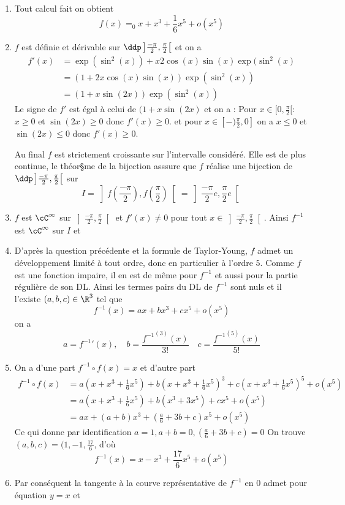\begin{correction}
\begin{enumerate}
\item Tout calcul fait on obtient 
$$f(x) =_0 x +x^3+\frac{1}{6}x^5 +o(x^5)$$
\item $f$ est définie et dérivable sur $\ddp \left] \frac{-\pi}{2},\frac{\pi}{2}\right[$ et on a 
\begin{align*}
f'(x) &= \exp(\sin^2(x)) +x 2\cos(x)\sin(x) \exp(\sin^2(x)\\
&= (1+ 2x\cos(x)\sin(x))\exp(\sin^2(x)) \\
&=(1+x\sin(2x))\exp(\sin^2(x)) 
\end{align*}
Le signe de $f'$ est égal à celui de $(1+x\sin(2x)$ et on a :
Pour $x \in [0,\frac{\pi}{2}[ :$ $x\geq 0 $ et $\sin(2x) \geq 0$ donc 
$f'(x) \geq 0$. 
et pour $x\in [-)\frac{\pi}{2} , 0]$ on a $x\leq 0$ et $\sin(2x) \leq 0$ donc $f'(x)\geq 0$.  

Au final $f$ est strictement croissante sur l'intervalle considéré. Elle est de plus  continue, le théor§me de la bijection asssure que $f$ réalise une bijection de $\ddp \left] \frac{-\pi}{2},\frac{\pi}{2}\right[$ sur $$I =\left] f(\frac{-\pi}{2}),f(\frac{\pi}{2})\right[ = \left] \frac{-\pi}{2}e,\frac{\pi}{2}e\right[$$

\item $f$ est $\cC^{\infty} $ sur  $\left] \frac{-\pi}{2},\frac{\pi}{2}\right[$ et $f'(x) \neq 0$ pour tout $x\in \left] \frac{-\pi}{2},\frac{\pi}{2}\right[$. Ainsi $f^{-1}$ est $\cC^{\infty}$ sur $I$ et 
\item D'après la question précédente et la formule de Taylor-Young, $f$ admet un développement limité à tout ordre, donc en particulier à l'ordre $5$. 
Comme $f$ est une fonction impaire, il en est de même pour $f^{-1}$ et aussi pour la partie régulière de son DL.  Ainsi les termes pairs du DL de $f^{-1}$ sont nuls et il l'existe $(a,b,c)\in \R^3$ tel que 
$$f^{-1} (x) = ax+bx^3+cx^5+o(x^5)$$
on a 
$$a={f^{-1}}'(x), \quad b = \frac{{f^{-1}}^{(3)}(x)}{3!} \quad  c = \frac{{f^{-1}}^{(5)}(x)}{5!}$$

\item On a d'une part $f^{-1}\circ f (x) = x$ et d'autre part 
\begin{align*}
f^{-1}\circ f (x) &= a (x +x^3+\frac{1}{6}x^5) +b (x +x^3+\frac{1}{6}x^5)^3 +c (x +x^3+\frac{1}{6}x^5)^5 +o(x^5)\\
&=  a (x +x^3+\frac{1}{6}x^5) +b (x^3 +3x^5) +c x^5 +o(x^5)\\
&=  a x +(a+b)x^3+(\frac{a}{6}+3b+c)x^5  +o(x^5)
\end{align*}
Ce qui donne par identification 
$a=1, a+b=0 , (\frac{a}{6}+3b+c)=0$
On trouve  $(a,b,c)= (1,-1 , \frac{17}{6}$, d'où 
$$f^{-1} (x) = x-x^3 + \frac{17}{6} x^5 +o(x^5)$$
\item Par conséquent la tangente à la courve représentative de $f^{-1} $ en $0$ admet pour équation $y=x$ et 


\end{enumerate}
\end{correction}
